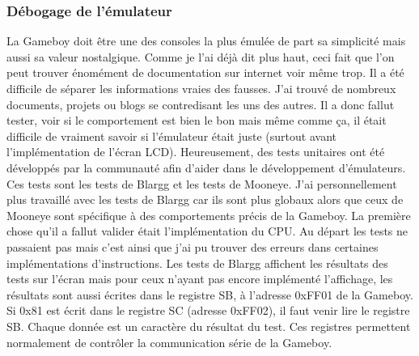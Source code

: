 \documentclass[a4paper]{article}
\begin{document}
\subsubsection{Débogage de l'émulateur}
La Gameboy doit être une des consoles la plus émulée de part sa simplicité mais aussi
sa valeur nostalgique. Comme je l'ai déjà dit plus haut, ceci fait que l'on peut
trouver énomément de documentation sur internet voir même trop. Il a été difficile
de séparer les informations vraies des fausses. J'ai trouvé de nombreux documents,
projets ou blogs se contredisant les uns des autres. Il a donc fallut tester, voir
si le comportement est bien le bon mais même comme ça, il était difficile de vraiment
savoir si l'émulateur était juste (surtout avant l'implémentation de l'écran LCD).
Heureusement, des tests unitaires ont été développés par la communauté afin d'aider
dans le développement d'émulateurs. Ces tests sont les tests de Blargg et les tests
de Mooneye. J'ai personnellement plus travaillé avec les tests de Blargg car ils
sont plus globaux alors que ceux de Mooneye sont spécifique à des comportements précis
de la Gameboy. La première chose qu'il a fallut valider était l'implémentation
du CPU. Au départ les tests ne passaient pas mais c'est ainsi que j'ai pu trouver
des erreurs dans certaines implémentations d'instructions. Les tests de Blargg
affichent les résultats des tests sur l'écran mais pour ceux n'ayant pas encore
implémenté l'affichage, les résultats sont aussi écrites dans le registre SB, à
l'adresse 0xFF01 de la Gameboy. Si 0x81 est écrit dans le registre SC (adresse 0xFF02),
il faut venir lire le registre SB. Chaque donnée est un caractère du résultat
du test. Ces registres permettent normalement de contrôler la communication série
de la Gameboy.

\end{document}
